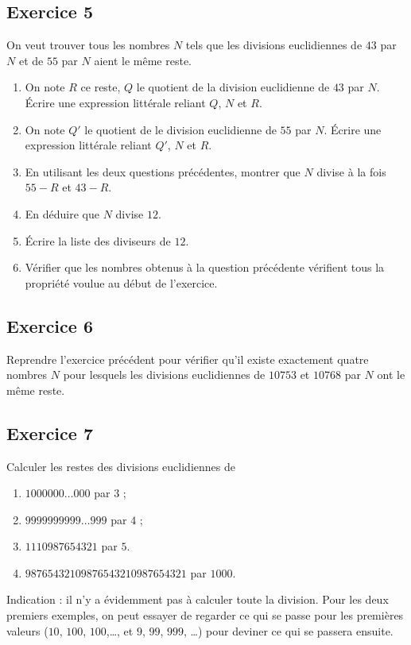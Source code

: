 \documentclass[12 pt]{article}
\theoremstyle{plain}
\newcounter{n}
\numberwithin{n}{section}
\begin{document}
\subsection*{Exercice 5}

On veut trouver tous les nombres $N$ tels que les divisions euclidiennes de $43$ par $N$ et de $55$ par $N$ aient le même reste.
\begin{enumerate}
\item On note $R$ ce reste, $Q$ le quotient de la division euclidienne de $43$ par $N$. Écrire une expression littérale reliant
$Q$, $N$ et $R$.
\item On note $Q'$ le quotient de le division euclidienne de $55$ par $N$. Écrire une expression littérale reliant
$Q'$, $N$ et $R$.
\item En utilisant les deux questions précédentes, montrer que $N$ divise à la fois $55-R$ et $43-R$. 
\item En déduire que $N$ divise $12$. 
\item Écrire la liste des diviseurs de $12$. 
\item Vérifier que les nombres obtenus à la question précédente vérifient tous la propriété voulue au début de l'exercice.
\end{enumerate}

\subsection*{Exercice 6}

Reprendre l'exercice précédent pour vérifier qu'il existe exactement quatre nombres $N$ pour lesquels les divisions euclidiennes de $10 753$ et $10 768$ par $N$ ont le même reste.

\subsection*{Exercice 7}

Calculer les restes des divisions euclidiennes de \begin{enumerate}
\item $1 000 000 \ldots 000$ par $3$ ; 
\item $9 999 999 999 \ldots 999$ par $4$ ;
\item $1110987654321$ par $5$. 
\item $98765432109876543210987654321$ par $1000$. 
\end{enumerate}
Indication : il n'y a évidemment pas à calculer toute la division. Pour les deux premiers exemples, on peut essayer de regarder ce qui se passe pour les premières valeurs ($10$, $100$, $100$,\ldots, et $9$, $99$, $999$, \ldots) pour deviner ce qui se passera ensuite. 
\end{document}
